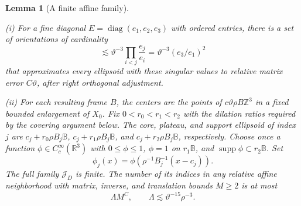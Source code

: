 \documentclass[11pt]{amsart}
\newtheorem{lemma}[theorem]{Lemma}
\theoremstyle{definition}
\theoremstyle{remark}
\numberwithin{equation}{section}
\begin{document}
\begin{lemma}[A finite affine family]\label{an:catalogue}

\leavevmode\noindent\textup{(i)} For a fine diagonal $E=\operatorname{diag}(e_1,e_2,e_3)$ with ordered entries, there is a set of orientations of cardinality
\begin{equation}\label{an:orientation-number}
\lesssim\vartheta^{-3}\prod_{i<j}\frac{e_j}{e_i}=\vartheta^{-3}(e_3/e_1)^2
\end{equation}
that approximates every ellipsoid with these singular values to relative matrix error $C\vartheta$, after right orthogonal adjustment.

\noindent\textup{(ii)} For each resulting frame $B$, the centers are the points of $c\vartheta\rho B\mathbb Z^3$ in a fixed bounded enlargement of $X_0$. Fix $0<r_0<r_1<r_2$ with the dilation ratios required by the covering argument below. The core, plateau, and support ellipsoid of index $j$ are $c_j+r_0\rho B_j\mathbb B$, $c_j+r_1\rho B_j\mathbb B$, and $c_j+r_2\rho B_j\mathbb B$, respectively. Choose once a function $\phi\in C_c^\infty(\mathbb R^3)$ with $0\le\phi\le1$, $\phi=1$ on $r_1\mathbb B$, and $\operatorname{supp}\phi\subset r_2\mathbb B$. Set
\[
\phi_j(x)=\phi\!\left(\rho^{-1}B_j^{-1}(x-c_j)\right).
\]
The full family $\mathcal J_D$ is finite. The number of its indices in any relative affine neighborhood with matrix, inverse, and translation bounds $M\ge2$ is at most
\begin{equation}\label{an:local-packing}
\Lambda M^C,\qquad \Lambda\lesssim \vartheta^{-15}\rho^{-3}.
\end{equation}
\end{lemma}
\end{document}
